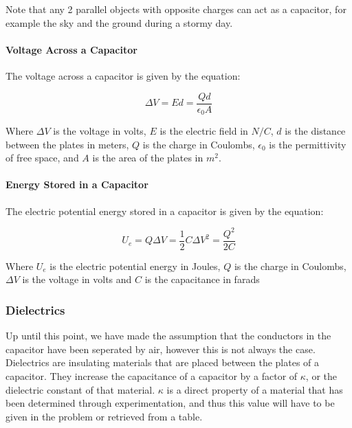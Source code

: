 Note that any 2 parallel objects with opposite charges can act as a capacitor, for example the sky and the ground during a stormy day.


\paragraph*{Voltage Across a Capacitor}
The voltage across a capacitor is given by the equation:

\begin{equation*}
    \Delta V = Ed = \frac{Qd}{\epsilon_0 A}
\end{equation*}

Where $\Delta V$ is the voltage in volts, $E$ is the electric field in $N/C$, $d$ is the distance between the plates in meters, $Q$ is the charge in Coulombs, $\epsilon_0$ is the permittivity of free space, and $A$ is the area of the plates in $m^2$.\\


\paragraph*{Energy Stored in a Capacitor}
The electric potential energy stored in a capacitor is given by the equation:

\begin{equation*}
    U_e = Q\Delta V = \frac{1}{2}C\Delta V^2 = \frac{Q^2}{2C}
\end{equation*}

Where $U_e$ is the electric potential energy in Joules, $Q$ is the charge in Coulombs, $\Delta V$ is the voltage in volts and $C$ is the capacitance in farads\\

\hrulefill


\subsubsection*{Dielectrics}

\hspace{.5cm} Up until this point, we have made the assumption that the conductors in the capacitor have been seperated by air, however this is not always the case. Dielectrics are insulating materials that are placed between the plates of a capacitor. 
They increase the capacitance of a capacitor by a factor of $\kappa$, or the dielectric constant of that material. $\kappa$ is a direct property of a material that has been determined through experimentation, and thus this value will have to be given
in the problem or retrieved from a table.

